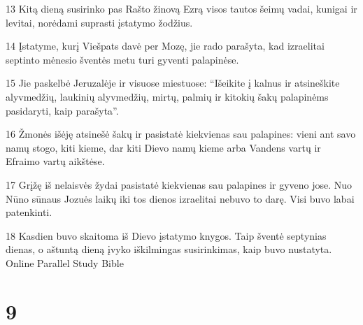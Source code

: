 \par 13 Kitą dieną susirinko pas Rašto žinovą Ezrą visos tautos šeimų vadai, kunigai ir levitai, norėdami suprasti įstatymo žodžius. 
\par 14 Įstatyme, kurį Viešpats davė per Mozę, jie rado parašyta, kad izraelitai septinto mėnesio šventės metu turi gyventi palapinėse. 
\par 15 Jie paskelbė Jeruzalėje ir visuose miestuose: “Išeikite į kalnus ir atsineškite alyvmedžių, laukinių alyvmedžių, mirtų, palmių ir kitokių šakų palapinėms pasidaryti, kaip parašyta”. 
\par 16 Žmonės išėję atsinešė šakų ir pasistatė kiekvienas sau palapines: vieni ant savo namų stogo, kiti kieme, dar kiti Dievo namų kieme arba Vandens vartų ir Efraimo vartų aikštėse. 
\par 17 Grįžę iš nelaisvės žydai pasistatė kiekvienas sau palapines ir gyveno jose. Nuo Nūno sūnaus Jozuės laikų iki tos dienos izraelitai nebuvo to darę. Visi buvo labai patenkinti. 
\par 18 Kasdien buvo skaitoma iš Dievo įstatymo knygos. Taip šventė septynias dienas, o aštuntą dieną įvyko iškilmingas susirinkimas, kaip buvo nustatyta.
Online Parallel Study Bible



\chapter{9}

